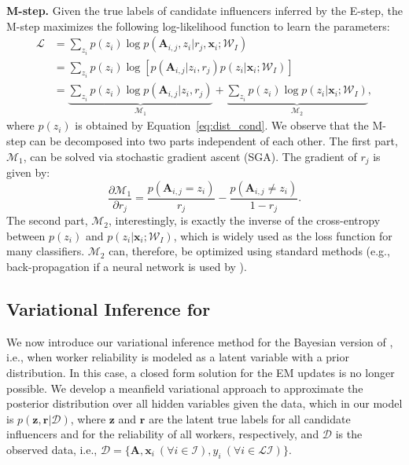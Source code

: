 \smallskip
\noindent\textbf{M-step.}
Given the true labels of candidate influencers inferred by the E-step, the M-step maximizes the following log-likelihood function to learn the parameters:
\begin{align}
   \mathcal{L} 
    &=\sum_{z_i}p(z_i)\log p(\mathbf{A}_{i,j},z_i|r_j,\mathbf{x}_i;\mathcal{W}_I)\nonumber\\
    &=\sum_{z_i}p(z_i)\log [p(\mathbf{A}_{i,j}| z_i , r_j)  p(z_i |\mathbf{x}_i;\mathcal{W}_I)] \label{eq:likelihood_m}\\
    &=\underbrace{\sum_{z_i}p(z_i) \log p(\mathbf{A}_{i,j}| z_i , r_j)}_{\mathcal{M}_1}
    +\underbrace{\sum_{z_i}p(z_i)\log p(z_i |\mathbf{x}_i;\mathcal{W}_I)}_{\mathcal{M}_2},
    \nonumber
\end{align}
where $p(z_i)$ is obtained by Equation~\ref{eq:dist_cond}. We observe that the M-step can be decomposed into two parts independent of each other. The first part, $\mathcal{M}_1$, can be solved via stochastic gradient ascent (SGA). The gradient of $r_j$ is given by:
%
\begin{equation}
    \frac{\partial \mathcal{M}_1}{\partial r_j}=\frac{p(\mathbf{A}_{i,j}=z_i)}{r_j}-\frac{p(\mathbf{A}_{i,j}\neq z_i)}{1-r_j}.
    \label{eq:grad_rj}
\end{equation}
%
The second part, $\mathcal{M}_2$, interestingly, is exactly the inverse of the cross-entropy between $p(z_i)$ and $p(z_i |\mathbf{x}_i;\mathcal{W}_I)$, which is widely used as the loss function for many classifiers. $\mathcal{M}_2$ can, therefore, be optimized using standard methods (e.g., back-propagation if a neural network is used by \sys).

\subsection{Variational Inference for \sys}
\label{sec:vi}

We now introduce our variational inference method for the Bayesian version of \sys, i.e., when worker reliability is modeled as a latent variable with a prior distribution. In this case, a closed form solution for the EM updates is no longer possible. We develop a meanfield variational approach to approximate the posterior distribution over all hidden variables given the data, which in our model is $p(\mathbf{z},\mathbf{r} | \mathcal{D})$, where $\mathbf{z}$ and $\mathbf{r}$ are the latent true labels for all candidate influencers and for the reliability of all workers, respectively, and $\mathcal{D}$ is the observed data, i.e., $\mathcal{D}=\{\mathbf{A}, \mathbf{x}_i\ (\forall i\in\mathcal{I}), y_i\ (\forall i\in \mathcal{LI})\}$. 

